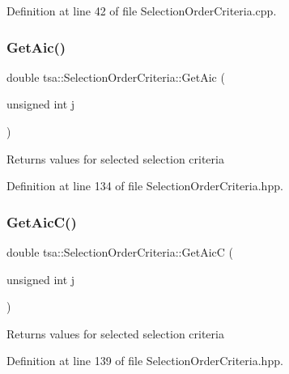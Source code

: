 Definition at line 42 of file Selection\+Order\+Criteria.\+cpp.

\mbox{\label{classtsa_1_1_selection_order_criteria_add034262822c903dfd6d52b00e014c07}} 
\subsubsection{\texorpdfstring{Get\+Aic()}{GetAic()}}
{\footnotesize\ttfamily double tsa\+::\+Selection\+Order\+Criteria\+::\+Get\+Aic (\begin{DoxyParamCaption}\item[{unsigned int}]{j }\end{DoxyParamCaption})\hspace{0.3cm}{\ttfamily [inline]}}

\begin{DoxyReturn}{Returns}
values for selected selection criteria 
\end{DoxyReturn}


Definition at line 134 of file Selection\+Order\+Criteria.\+hpp.

\mbox{\label{classtsa_1_1_selection_order_criteria_a8ccfe952a0ef4d2b60e0e6a968abc439}} 
\subsubsection{\texorpdfstring{Get\+Aic\+C()}{GetAicC()}}
{\footnotesize\ttfamily double tsa\+::\+Selection\+Order\+Criteria\+::\+Get\+AicC (\begin{DoxyParamCaption}\item[{unsigned int}]{j }\end{DoxyParamCaption})\hspace{0.3cm}{\ttfamily [inline]}}

\begin{DoxyReturn}{Returns}
values for selected selection criteria 
\end{DoxyReturn}


Definition at line 139 of file Selection\+Order\+Criteria.\+hpp.

